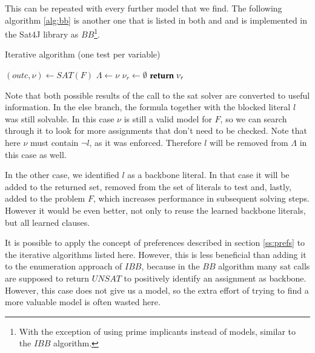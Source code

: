 This can be repeated with every further model that we find. The following algorithm \ref{alg:bb} is another one that is listed in both \cite{mjl10} and \cite{mjl15} and is implemented in the Sat4J library as $BB$\footnote{With the exception of using prime implicants instead of models, similar to the $IBB$ algorithm.}.

\begin{algorithm}
\caption{{\sc Iterative algorithm (one test per variable)}}
\label{alg:bb}
\DontPrintSemicolon
{}

$(outc,\nu) \gets SAT(F)$\;
$\Lambda \gets \nu$\;
$\nu_r \gets \emptyset$\;
$\Return \; \nu_r$\;
\end{algorithm}

Note that both possible results of the call to the sat solver are converted to useful information. In the else branch, the formula together with the blocked literal $l$ was still solvable. In this case $\nu$ is still a valid model for $F$, so we can search through it to look for more assignments that don't need to be checked. Note that here $\nu$ must contain $\neg l$, as it was enforced. Therefore $l$ will be removed from $\Lambda$ in this case as well.

In the other case, we identified $l$ as a backbone literal. In that case it will be added to the returned set, removed from the set of literals to test and, lastly, added to the problem $F$, which increases performance in subsequent solving steps. However it would be even better, not only to reuse the learned backbone literals, but all learned clauses.

It is possible to apply the concept of preferences described in section \ref{ss:prefs} to the iterative algorithms listed here. However, this is less beneficial than adding it to the enumeration approach of $IBB$, because in the $BB$ algorithm many sat calls are supposed to return $UNSAT$ to positively identify an assignment as backbone. However, this case does not give us a model, so the extra effort of trying to find a more valuable model is often wasted here.

